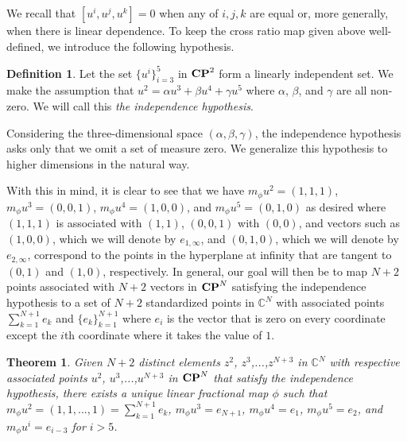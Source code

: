 \documentclass{amsart}
\theoremstyle{theorem}
\newtheorem{theorem}{Theorem}
\theoremstyle{lemma}
\theoremstyle{definition}
\newtheorem*{definition}{Definition}
\begin{document}
We recall that $[u^i, u^j, u^k]=0$ when any of $i,j,k$ are equal or, more generally, when there is linear dependence. To keep the cross ratio map given above well-defined, we introduce the following hypothesis.

\begin{definition}
Let the set $\{u^i\}_{i=3}^5$ in ${\bf CP}^2$ form a linearly independent set. We make the assumption that $u^2=\alpha u^3+\beta u^4+\gamma u^5$ where $\alpha$, $\beta$, and $\gamma$ are all non-zero. We will call this {\it the independence hypothesis}. 
\end{definition}

Considering the three-dimensional space $(\alpha, \beta, \gamma)$, the independence hypothesis asks only that we omit a set of measure zero. We generalize this hypothesis to higher dimensions in the natural way.

With this in mind, it is clear to see that we have $m_{\phi}u^2=(1,1,1)$, $m_{\phi}u^3=(0,0,1)$, $m_{\phi}u^4=(1,0,0)$, and $m_{\phi}u^5=(0,1,0)$ as desired where $(1,1,1)$ is associated with $(1,1)$, $(0,0,1)$ with $(0,0)$, and vectors such as $(1,0,0)$, which we will denote by $e_{1, \infty}$, and $(0,1,0)$, which we will denote by $e_{2, \infty}$, correspond to the points in the hyperplane at infinity that are tangent to $(0,1)$ and  $(1, 0)$, respectively. In general, our goal will then be to map $N+2$ points associated with $N+2$ vectors in ${\bf CP}^N$ satisfying the independence hypothesis to a set of $N+2$ standardized points in $\mathbb{C}^N$ with associated points $\sum_{k=1}^{N+1}e_k$ and $\{e_k\}_{k=1}^{N+1}$ where $e_i$ is the vector that is zero on every coordinate except the $i$th coordinate where it takes the value of $1$. 

\begin{theorem}
Given $N+2$ distinct elements $z^2$, $z^3$,...,$z^{N+3}$ in $\mathbb{C}^N$ with respective associated points $u^2$, $u^3$,...,$u^{N+3}$ in ${\bf CP}^N$ that satisfy the independence hypothesis, there exists a unique linear fractional map $\phi$ such that $m_{\phi}u^2=(1,1,...,1)=\sum_{k=1}^{N+1}e_k$, $m_{\phi}u^3=e_{N+1}$, $m_{\phi}u^4=e_1$, $m_{\phi}u^5=e_2$, and $m_{\phi}u^i=e_{i-3}$ for $i>5$.
\end{theorem}
\end{document}
